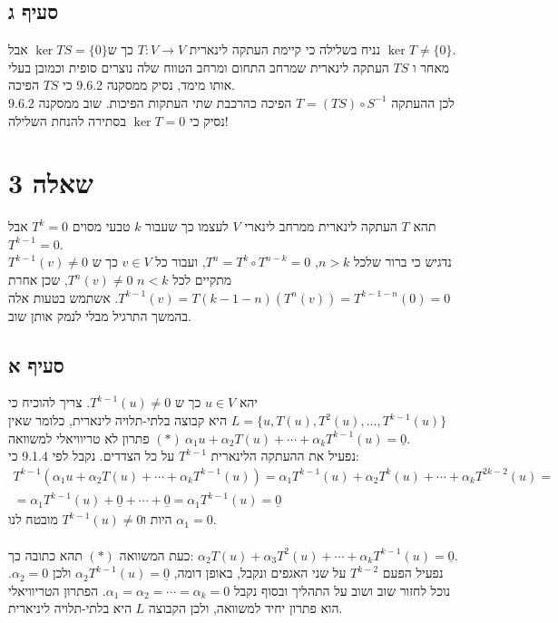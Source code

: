 \documentclass{article}
\def\zerovec{\underline{0}}
\begin{document}
\subsection*{סעיף ג}

נניח בשלילה כי קיימת העתקה לינארית $T: V\rightarrow V$ כך ש$\ker TS=\{ 0 \}$ אבל $\ker T\ne \{ 0 \}$.\\
מאחר ו $TS$ העתקה לינארית שמרחב התחום ומרחב הטווח שלה נוצרים סופית וכמובן בעלי אותו מימד, נסיק ממסקנה 9.6.2 כי $TS$ הפיכה.\\
לכן ההעתקה $T=(TS)\circ S^{-1}$ הפיכה כהרכבת שתי העתקות הפיכות.
שוב ממסקנה $9.6.2$ נסיק כי $\ker T={0}$ בסתירה להנחת השלילה!

\pagebreak

\section*{שאלה 3}

תהא $T$ העתקה לינארית ממרחב לינארי $V$ לעצמו כך שעבור $k$ טבעי מסוים $T^k=0$ אבל $T^{k-1}=0$.\\
נדגיש כי ברור שלכל $n>k$, $T^{n}=T^{k}\circ T^{n-k}=0$, ועבור כל $v\in V$ כך ש $T^{k-1}(v)\ne 0$ מתקיים לכל $n<k$ $T^{n}(v)\ne 0$, שכן אחרת $T^{k-1}(v)=T({k-1-n})(T^{n}(v))=T^{k-1-n}(0)=0$.
אשתמש בטעות אלה בהמשך התרגיל מבלי לנמק אותן שוב.

\subsection*{סעיף א}

יהא $u\in V$ כך ש $T^{k-1}(u)\ne 0$.
צריך להוכיח כי $L=\{ u, T(u), T^2(u), ..., T^{k-1}(u) \}$ היא קבוצה בלתי-תלויה לינארית, כלומר שאין פתרון לא טריוויאלי למשוואה $(\ast) \ \alpha_1u+\alpha_2T(u)+\cdots + \alpha_k T^{k-1}(u)=\zerovec$.\\
נפעיל את ההעתקה הלינארית $T^{k-1}$ על כל הצדדים. נקבל לפי 9.1.4 כי:
\begin{align*}
    T^{k-1}(\alpha_1u+\alpha_2T(u)+\cdots + \alpha_k T^{k-1}(u))=\alpha_1T^{k-1}(u)+\alpha_2T^{k}(u)+\cdots + \alpha_k T^{2k-2}(u)= \\
    =\alpha_1 T^{k-1}(u)+\zerovec+\cdots+\zerovec = \alpha_1T^{k-1}(u)=\zerovec
\end{align*}
היות ו$T^{k-1}(u)\ne 0$ מובטח לנו $\alpha_1=0$.
\\\\
כעת המשוואה $(*)$ תהא כתובה כך: $\alpha_2T(u)+\alpha_3T^2(u)+\cdots+\alpha_kT^{k-1}(u)=\zerovec$.\\
נפעיל הפעם $T^{k-2}$ על שני האגפים ונקבל, באופן דומה, $\alpha_2T^{k-1}(u)=\zerovec$ ולכן $\alpha_2=0$.
נוכל לחזור שוב ושוב על התהליך ובסוף נקבל $\alpha_1=\alpha_2=\cdots=\alpha_k=0$.
הפתרון הטריוויאלי הוא פתרון יחיד למשוואה, ולכן הקבוצה $L$ היא בלתי-תלויה ליניארית.
\end{document}

